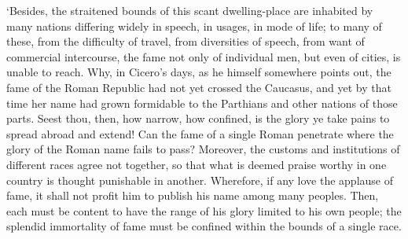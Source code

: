\documentclass[12pt]{book}
\begin{document}
`Besides, the straitened bounds of this scant dwelling-place are
inhabited by many nations differing widely in speech, in usages, in mode
of life; to many of these, from the difficulty of travel, from
diversities of speech, from want of commercial intercourse, the fame not
only of individual men, but even of cities, is unable to reach. Why, in
Cicero's days, as he himself somewhere points out, the fame of the Roman
Republic had not yet crossed the Caucasus, and yet by that time her
name had grown formidable to the Parthians and other nations of those
parts. Seest thou, then, how narrow, how confined, is the glory ye take
pains to spread abroad and extend! Can the fame of a single Roman
penetrate where the glory of the Roman name fails to pass? Moreover, the
customs and institutions of different races agree not together, so that
what is deemed praise worthy in one country is thought punishable in
another. Wherefore, if any love the applause of fame, it shall not
profit him to publish his name among many peoples. Then, each must be
content to have the range of his glory limited to his own people; the
splendid immortality of fame must be confined within the bounds of a
single race.
\end{document}
